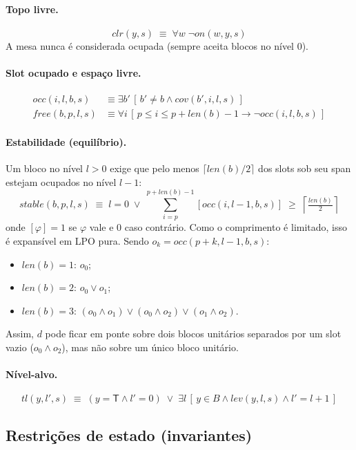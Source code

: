 \documentclass[11pt,a4paper]{article}
\newcommand{\Lev}{\mathit{lev}}
\newcommand{\Clr}{\mathit{clr}}
\newcommand{\On}{\mathit{on}}
\newcommand{\Cov}{\mathit{cov}}
\newcommand{\Occ}{\mathit{occ}}
\newcommand{\Free}{\mathit{free}}
\newcommand{\Stable}{\mathit{stable}}
\newcommand{\Tl}{\mathit{tl}}
\newcommand{\Len}{\mathit{len}}
\newcommand{\Mesa}{\mathsf{T}}
\begin{document}
\paragraph{Topo livre.}
\[
\Clr(y,s)\;\equiv\;\forall w\;\neg\On(w,y,s)
\]
A mesa nunca é considerada ocupada (sempre aceita blocos no nível 0).

\paragraph{Slot ocupado e espaço livre.}
\begin{align*}
\Occ(i,l,b,s)&\equiv \exists b'\,[\,b'\neq b\wedge\Cov(b',i,l,s)\,]\\
\Free(b,p,l,s)&\equiv \forall i\,[\,p\le i\le p+\Len(b)-1\rightarrow\neg\Occ(i,l,b,s)\,]
\end{align*}

\paragraph{Estabilidade (equilíbrio).}
Um bloco no nível $l>0$ exige que pelo menos $\lceil\Len(b)/2\rceil$ dos slots sob seu span estejam ocupados no nível $l-1$:
\[
\Stable(b,p,l,s)\;\equiv\; l=0\;\vee\;\sum_{i=p}^{p+\Len(b)-1}[\Occ(i,l-1,b,s)]\;\ge\;\left\lceil\tfrac{\Len(b)}{2}\right\rceil
\]
onde $[\varphi]=1$ se $\varphi$ vale e $0$ caso contrário. Como o comprimento é limitado, isso é expansível em LPO pura. Sendo $o_k=\Occ(p+k,l-1,b,s)$:
\begin{itemize}
  \item $\Len(b)=1$: $o_0$;
  \item $\Len(b)=2$: $o_0\vee o_1$;
  \item $\Len(b)=3$: $(o_0\wedge o_1)\vee(o_0\wedge o_2)\vee(o_1\wedge o_2)$.
\end{itemize}
Assim, $d$ pode ficar em ponte sobre dois blocos unitários separados por um slot vazio ($o_0\wedge o_2$), mas não sobre um único bloco unitário.

\paragraph{Nível-alvo.}
\[
\Tl(y,l',s)\;\equiv\;(y=\Mesa\wedge l'=0)\;\vee\;\exists l\,[\,y\in B\wedge\Lev(y,l,s)\wedge l'=l+1\,]
\]

\subsection{Restrições de estado (invariantes)}
\end{document}
